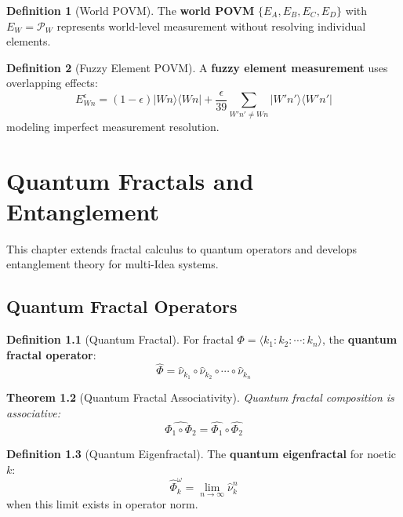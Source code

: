 \documentclass[11pt,twoside,openright]{book}
\theoremstyle{definition}
\newtheorem{definition}{Definition}[chapter]
\theoremstyle{plain}
\newtheorem{theorem}[definition]{Theorem}
\theoremstyle{remark}
\newcommand{\Frac}{\Phi}
\newcommand{\qket}[1]{|#1\rangle}
\newcommand{\qbra}[1]{\langle #1|}
\newcommand{\qop}[1]{\hat{#1}}
\newcommand{\Projector}{\mathcal{P}}         %
\newcommand{\vnewtwo}{\textbf{v7.2 New}}
\begin{document}
\begin{definition}[World POVM]
\label{def:world-povm}
The \textbf{world POVM} $\{E_A, E_B, E_C, E_D\}$ with $E_W = \Projector_W$ represents world-level measurement without resolving individual elements.
\end{definition}

\begin{definition}[Fuzzy Element POVM]
\label{def:fuzzy-povm}
A \textbf{fuzzy element measurement} uses overlapping effects:
\[
E_{Wn}^\epsilon = (1-\epsilon)\qket{Wn}\qbra{Wn} + \frac{\epsilon}{39}\sum_{W'n' \neq Wn} \qket{W'n'}\qbra{W'n'}
\]
modeling imperfect measurement resolution.
\end{definition}


\chapter{Quantum Fractals and Entanglement}
\label{ch:quantum-fractals}

\begin{tcolorbox}[colback=blue!5!white,colframe=blue!75!black,title=\vnewtwo]
This chapter extends fractal calculus to quantum operators and develops entanglement theory for multi-Idea systems.
\end{tcolorbox}

\section{Quantum Fractal Operators}

\begin{definition}[Quantum Fractal]
\label{def:quantum-fractal}
For fractal $\Frac = \langle k_1 : k_2 : \cdots : k_n \rangle$, the \textbf{quantum fractal operator}:
\[
\qop{\Phi} = \qop{\nu}_{k_1} \circ \qop{\nu}_{k_2} \circ \cdots \circ \qop{\nu}_{k_n}
\]
\end{definition}

\begin{theorem}[Quantum Fractal Associativity]
\label{thm:quantum-frac-assoc}
Quantum fractal composition is associative:
\[
\qop{\Phi_1 \circ \Phi_2} = \qop{\Phi_1} \circ \qop{\Phi_2}
\]
\end{theorem}

\begin{definition}[Quantum Eigenfractal]
\label{def:quantum-eigenfractal}
The \textbf{quantum eigenfractal} for noetic $k$:
\[
\qop{\Phi}_k^\omega = \lim_{n \to \infty} \qop{\nu}_k^n
\]
when this limit exists in operator norm.
\end{definition}
\end{document}

